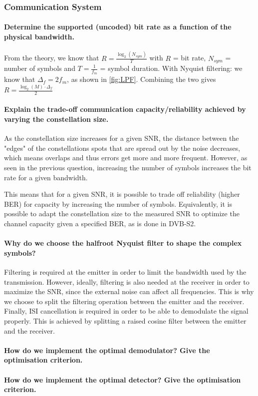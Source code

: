 \subsubsection{Communication System}
\paragraph{Determine the supported (uncoded) bit rate as a function of the physical bandwidth.} From the theory, we know that $R = \frac{\log_2(N_{sym})}{T}$ with $R$ = bit rate, $N_{sym}$ = number of symbols and $T = \frac{1}{f_m}$ = symbol duration.
With Nyquist filtering: we know that $\Delta_f = 2f_m$, as shown in \ref{fig:LPF}.
Combining the two gives $R = \frac{\log_2(M)\cdot\Delta_f}{2}$

\paragraph{Explain the trade-off communication capacity/reliability achieved by varying the constellation size.}
As the constellation size increases for a given SNR, the distance between the "edges" of the constellations spots that are spread out by the noise decreases, which means overlaps and thus errors get more and more frequent.
However, as seen in the previous question, increasing the number of symbols increases the bit rate for a given bandwidth.

This means that for a given SNR, it is possible to trade off reliability (higher BER) for capacity by increasing the number of symbols. Equivalently, it is possible to adapt the constellation size to the measured SNR to optimize the channel capacity given a specified BER, as is done in DVB-S2.

\paragraph{Why do we choose the halfroot Nyquist filter to shape the complex symbols?}
Filtering is required at the emitter in order to limit the bandwidth used by the transmission.
However, ideally, filtering is also needed at the receiver in order to maximize the SNR, since the external noise can affect all frequencies.
This is why we choose to split the filtering operation between the emitter and the receiver.
Finally, ISI cancellation is required in order to be able to demodulate the signal properly.
This is achieved by splitting a raised cosine filter between the emitter and the receiver.

\paragraph{How do we implement the optimal demodulator? Give the optimisation criterion.}


\paragraph{How do we implement the optimal detector? Give the optimisation criterion.}
